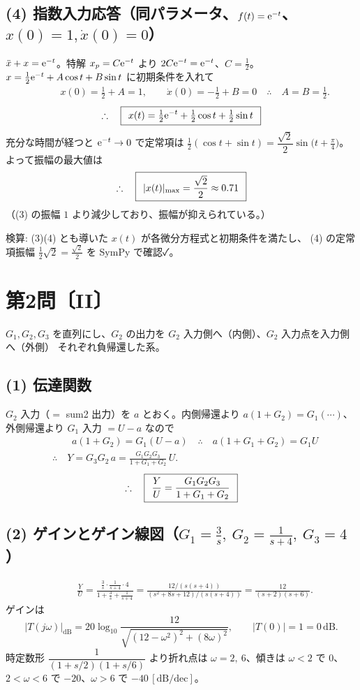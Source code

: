 \documentclass[11pt,a4paper]{article}
\begin{document}
\subsection*{(4) 指数入力応答（同パラメータ、$f(t)=\mathrm{e}^{-t}$、$x(0)=1,\dot x(0)=0$）}
$\ddot{x}+x=\mathrm{e}^{-t}$。特解 $x_p=C\mathrm{e}^{-t}$ より $2C\mathrm{e}^{-t}=\mathrm{e}^{-t}$、$C=\tfrac12$。
$x=\tfrac12\mathrm{e}^{-t}+A\cos t+B\sin t$ に初期条件を入れて
\begin{align*}
  &\qquad x(0)=\tfrac12+A=1,\qquad \dot{x}(0)=-\tfrac12+B=0
   \quad\therefore\quad A=B=\tfrac12.
\end{align*}
\[
  \therefore\quad \boxed{\,\;x(t)=\tfrac12\mathrm{e}^{-t}+\tfrac12\cos t+\tfrac12\sin t\;\,}
\]
充分な時間が経つと $\mathrm{e}^{-t}\to0$ で定常項は $\tfrac12(\cos t+\sin t)=\dfrac{\sqrt2}{2}\sin\!\bigl(t+\tfrac{\pi}{4}\bigr)$。
よって振幅の最大値は
\[
  \therefore\quad \boxed{\,\;|x(t)|_{\max}=\dfrac{\sqrt2}{2}\approx0.71\;\,}
\]
（(3) の振幅 $1$ より減少しており、振幅が抑えられている。）

\bigskip
\noindent 検算: (3)(4) とも導いた $x(t)$ が各微分方程式と初期条件を満たし、
(4) の定常項振幅 $\tfrac12\sqrt2=\tfrac{\sqrt2}{2}$ を SymPy で確認✓。

\newpage
\section*{第2問〔II〕}

$G_1,G_2,G_3$ を直列にし、$G_2$ の出力を $G_2$ 入力側へ（内側）、$G_2$ 入力点を入力側へ（外側）
それぞれ負帰還した系。

\subsection*{(1) 伝達関数}
$G_2$ 入力（$=$ sum2 出力）を $a$ とおく。内側帰還より $a(1+G_2)=G_1(\cdots)$、外側帰還より
$G_1$ 入力 $=U-a$ なので
\begin{align*}
  &\qquad a(1+G_2)=G_1(U-a)
   \quad\therefore\quad a(1+G_1+G_2)=G_1 U\\
  &\therefore\quad Y=G_3 G_2\,a=\frac{G_1G_2G_3}{1+G_1+G_2}\,U.
\end{align*}
\[
  \therefore\quad \boxed{\,\;\dfrac{Y}{U}=\dfrac{G_1G_2G_3}{1+G_1+G_2}\;\,}
\]

\subsection*{(2) ゲインとゲイン線図（$G_1=\frac3s,\ G_2=\frac{1}{s+4},\ G_3=4$）}
\begin{align*}
  &\qquad \frac{Y}{U}=\frac{\frac3s\cdot\frac{1}{s+4}\cdot4}{1+\frac3s+\frac{1}{s+4}}
   =\frac{12/(s(s+4))}{(s^2+8s+12)/(s(s+4))}
   =\frac{12}{(s+2)(s+6)}.
\end{align*}
ゲインは
\[
  |T(j\omega)|_{\mathrm{dB}}=20\log_{10}\frac{12}{\sqrt{(12-\omega^2)^2+(8\omega)^2}},\qquad |T(0)|=1=0\,\mathrm{dB}.
\]
時定数形 $\dfrac{1}{(1+s/2)(1+s/6)}$ より折れ点は $\omega=2,\ 6$、傾きは $\omega<2$ で $0$、
$2<\omega<6$ で $-20$、$\omega>6$ で $-40\,[\mathrm{dB/dec}]$。
\end{document}
